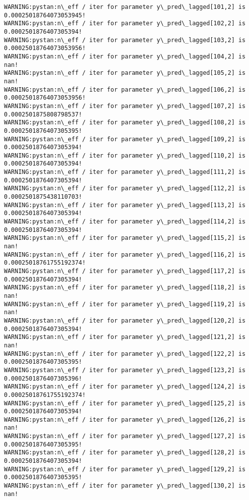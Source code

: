 \documentclass[11pt]{article}
\begin{document}
\begin{Verbatim}[commandchars=\\\{\}]
WARNING:pystan:n\_eff / iter for parameter y\_pred\_lagged[101,2] is 0.00025018764073053945!
WARNING:pystan:n\_eff / iter for parameter y\_pred\_lagged[102,2] is 0.0002501876407305394!
WARNING:pystan:n\_eff / iter for parameter y\_pred\_lagged[103,2] is 0.00025018764073053956!
WARNING:pystan:n\_eff / iter for parameter y\_pred\_lagged[104,2] is nan!
WARNING:pystan:n\_eff / iter for parameter y\_pred\_lagged[105,2] is nan!
WARNING:pystan:n\_eff / iter for parameter y\_pred\_lagged[106,2] is 0.00025018764073053956!
WARNING:pystan:n\_eff / iter for parameter y\_pred\_lagged[107,2] is 0.0002501875808798537!
WARNING:pystan:n\_eff / iter for parameter y\_pred\_lagged[108,2] is 0.0002501876407305395!
WARNING:pystan:n\_eff / iter for parameter y\_pred\_lagged[109,2] is 0.0002501876407305394!
WARNING:pystan:n\_eff / iter for parameter y\_pred\_lagged[110,2] is 0.0002501876407305394!
WARNING:pystan:n\_eff / iter for parameter y\_pred\_lagged[111,2] is 0.0002501876407305394!
WARNING:pystan:n\_eff / iter for parameter y\_pred\_lagged[112,2] is 0.0002501875438110703!
WARNING:pystan:n\_eff / iter for parameter y\_pred\_lagged[113,2] is 0.0002501876407305394!
WARNING:pystan:n\_eff / iter for parameter y\_pred\_lagged[114,2] is 0.0002501876407305394!
WARNING:pystan:n\_eff / iter for parameter y\_pred\_lagged[115,2] is nan!
WARNING:pystan:n\_eff / iter for parameter y\_pred\_lagged[116,2] is 0.00025018761755192374!
WARNING:pystan:n\_eff / iter for parameter y\_pred\_lagged[117,2] is 0.0002501876407305394!
WARNING:pystan:n\_eff / iter for parameter y\_pred\_lagged[118,2] is nan!
WARNING:pystan:n\_eff / iter for parameter y\_pred\_lagged[119,2] is nan!
WARNING:pystan:n\_eff / iter for parameter y\_pred\_lagged[120,2] is 0.0002501876407305394!
WARNING:pystan:n\_eff / iter for parameter y\_pred\_lagged[121,2] is nan!
WARNING:pystan:n\_eff / iter for parameter y\_pred\_lagged[122,2] is 0.0002501876407305395!
WARNING:pystan:n\_eff / iter for parameter y\_pred\_lagged[123,2] is 0.0002501876407305396!
WARNING:pystan:n\_eff / iter for parameter y\_pred\_lagged[124,2] is 0.00025018761755192374!
WARNING:pystan:n\_eff / iter for parameter y\_pred\_lagged[125,2] is 0.0002501876407305394!
WARNING:pystan:n\_eff / iter for parameter y\_pred\_lagged[126,2] is nan!
WARNING:pystan:n\_eff / iter for parameter y\_pred\_lagged[127,2] is 0.0002501876407305395!
WARNING:pystan:n\_eff / iter for parameter y\_pred\_lagged[128,2] is 0.0002501876407305394!
WARNING:pystan:n\_eff / iter for parameter y\_pred\_lagged[129,2] is 0.0002501876407305395!
WARNING:pystan:n\_eff / iter for parameter y\_pred\_lagged[130,2] is nan!

\end{Verbatim}
\end{document}
